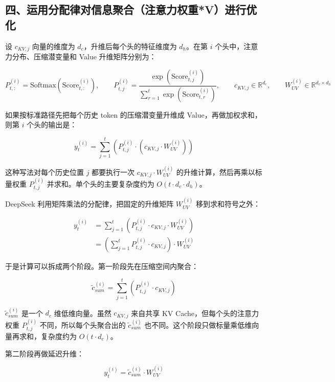 \hypertarget{ux56dbux8fd0ux7528ux5206ux914dux5f8bux5bf9ux4fe1ux606fux805aux5408ux6ce8ux610fux529bux6743ux91cdvux8fdbux884cux4f18ux5316}{%
\subsection{四、运用分配律对信息聚合（注意力权重*V）进行优化}\label{ux56dbux8fd0ux7528ux5206ux914dux5f8bux5bf9ux4fe1ux606fux805aux5408ux6ce8ux610fux529bux6743ux91cdvux8fdbux884cux4f18ux5316}}

设 \(c_{KV,j}\) 向量的维度为 \(d_c\)，升维后每个头的特征维度为 \(d_h\)。在第 \(i\) 个头中，注意力分布、压缩潜变量和 Value 升维矩阵分别为：

\[
P_{t,:}^{(i)} = \mathrm{Softmax}(\mathrm{Score}_{t,:}^{(i)}),\qquad
P_{t,j}^{(i)} =
\frac{\exp(\mathrm{Score}_{t,j}^{(i)})}{\sum_{r=1}^{t}\exp(\mathrm{Score}_{t,r}^{(i)})},\qquad
c_{KV,j}\in \mathbb{R}^{d_c},\qquad
W_{UV}^{(i)}\in \mathbb{R}^{d_c \times d_h}
\]

如果按标准路径先把每个历史 token 的压缩潜变量升维成 Value，再做加权求和，则第 \(i\) 个头的输出是：

\[
y_t^{(i)}
=
\sum_{j=1}^{t}
\left(P_{t,j}^{(i)} \cdot (c_{KV,j} \cdot W_{UV}^{(i)})\right)
\]

这种写法对每个历史位置 \(j\) 都要执行一次 \(c_{KV,j} \cdot W_{UV}^{(i)}\) 的升维计算，然后再乘以标量权重 \(P_{t,j}^{(i)}\) 并求和。单个头的主要复杂度约为 \(O(t \cdot d_c \cdot d_h)\)。

DeepSeek 利用矩阵乘法的分配律，把固定的升维矩阵 \(W_{UV}^{(i)}\) 移到求和符号之外：

\[
\begin{aligned}
y_t^{(i)}
&= \sum_{j=1}^{t}\left(P_{t,j}^{(i)} \cdot c_{KV,j} \cdot W_{UV}^{(i)}\right) \\
&= \left(\sum_{j=1}^{t}P_{t,j}^{(i)} \cdot c_{KV,j}\right) \cdot W_{UV}^{(i)}
\end{aligned}
\]

于是计算可以拆成两个阶段。第一阶段先在压缩空间内聚合：

\[
\tilde c_{sum}^{(i)}
=
\sum_{j=1}^{t}\left(P_{t,j}^{(i)} \cdot c_{KV,j}\right)
\]

\(\tilde c_{sum}^{(i)}\) 是一个 \(d_c\) 维低维向量。虽然 \(c_{KV,j}\) 来自共享 KV Cache，但每个头的注意力权重 \(P_{t,j}^{(i)}\) 不同，所以每个头聚合出的 \(\tilde c_{sum}^{(i)}\) 也不同。这个阶段只做标量乘低维向量再求和，复杂度约为 \(O(t \cdot d_c)\)。

第二阶段再做延迟升维：

\[
y_t^{(i)} = \tilde c_{sum}^{(i)} \cdot W_{UV}^{(i)}
\]

